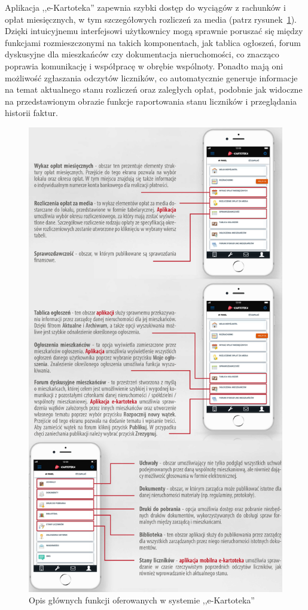 Aplikacja ,,e-Kartoteka'' zapewnia szybki dostęp do wyciągów z rachunków i opłat miesięcznych, w tym szczegółowych rozliczeń za media (patrz rysunek~\ref{fig:kartoteka_manual}). Dzięki intuicyjnemu interfejsowi użytkownicy mogą sprawnie poruszać się między funkcjami rozmieszczonymi na takich komponentach, jak tablica ogłoszeń, forum dyskusyjne dla mieszkańców czy dokumentacja nieruchomości, co znacząco poprawia komunikację i współpracę w obrębie wspólnoty. Ponadto mają oni możliwość zgłaszania odczytów liczników, co automatycznie generuje informacje na temat aktualnego stanu rozliczeń oraz zaległych opłat, podobnie jak widoczne na przedstawionym obrazie funkcje raportowania stanu liczników i przeglądania historii faktur.
\begin{figure}[ht]
    \centering
    \includegraphics[width=0.6\linewidth]{rys01/kartoteka_manual}
    \caption{Opis głównych funkcji oferowanych w systemie ,,e-Kartoteka''~\cite{e-kartoteka_manual}}
    \label{fig:kartoteka_manual}
\end{figure}

